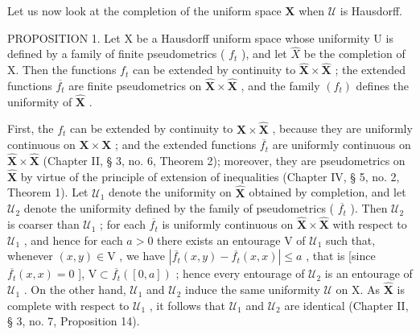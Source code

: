 Let us now look at the completion of the uniform space \(\mathbf{X}\) when \(\mathcal{U}\) is Hausdorff.

PROPOSITION 1. Let X be a Hausdorff uniform space whose uniformity U is defined by a family of finite pseudometrics ( \(f_{t}\) ), and let \(\hat{X}\) be the completion of X. Then the functions \(f_{t}\) can be extended by continuity to \(\hat{\mathbf{X}} \times \hat{\mathbf{X}}\) ; the extended functions \(\overline{f_t}\) are finite pseudometrics on \(\hat{\mathbf{X}} \times \hat{\mathbf{X}}\) , and the family \((f_{t})\) defines the uniformity of \(\hat{\mathbf{X}}\) .

First, the \(f_{t}\) can be extended by continuity to \(\hat{\mathbf{X}}\times\hat{\mathbf{X}}\) , because they are uniformly continuous on \(\mathbf{X}\times\mathbf{X}\) ; and the extended functions \(\overline{f_{t}}\) are uniformly continuous on \(\hat{\mathbf{X}}\times\hat{\mathbf{X}}\) (Chapter II, § 3, no. 6, Theorem 2); moreover, they are pseudometrics on \(\hat{\mathbf{X}}\) by virtue of the principle of extension of inequalities (Chapter IV, § 5, no. 2, Theorem 1). Let \(\mathcal{U}_{1}\) denote the uniformity on \(\hat{\mathbf{X}}\) obtained by completion, and let \(\mathcal{U}_{2}\) denote the uniformity defined by the family of pseudometrics ( \(\overline{f_{t}}\) ). Then \(\mathcal{U}_{2}\) is coarser than \(\mathcal{U}_{1}\) ; for each \(\overline{f_{t}}\) is uniformly continuous on \(\hat{\mathbf{X}}\times\hat{\mathbf{X}}\) with respect to \(\mathcal{U}_{1}\) , and hence for each \(a>0\) there exists an entourage V of \(\mathcal{U}_{1}\) such that, whenever \((x,y)\in\mathrm{V}\) , we have \(|\overline{f_{t}}(x,y)-\overline{f_{t}}(x,x)|\leqslant a\) , that is {[}since \(\overline{f_{t}}(x,x)=0\) {]}, \(\mathrm{V}\subset\overline{f_{t}}([0,a])\) ; hence every entourage of \(\mathcal{U}_{2}\) is an entourage of \(\mathcal{U}_{1}\) . On the other hand, \(\mathcal{U}_{1}\) and \(\mathcal{U}_{2}\) induce the same uniformity \(\mathcal{U}\) on X. As \(\hat{\mathbf{X}}\) is complete with respect to \(\mathcal{U}_{1}\) , it follows that \(\mathcal{U}_{1}\) and \(\mathcal{U}_{2}\) are identical (Chapter II, § 3, no. 7, Proposition 14).


